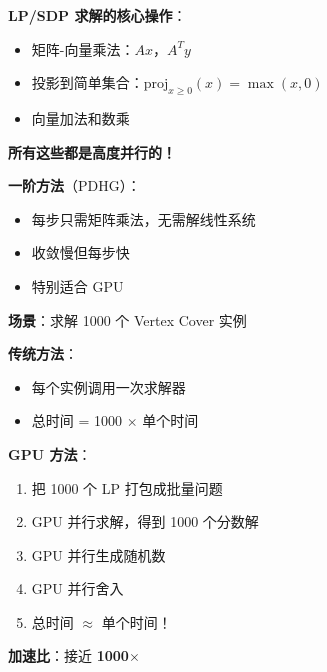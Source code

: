 \documentclass[12pt, a4paper]{ctexart}
\begin{document}
\begin{gpubox}

\textbf{LP/SDP 求解的核心操作}：

\begin{itemize}
    \item 矩阵-向量乘法：$Ax$，$A^T y$
    \item 投影到简单集合：$\text{proj}_{x \geq 0}(x) = \max(x, 0)$
    \item 向量加法和数乘
\end{itemize}

\textbf{所有这些都是高度并行的！}

\textbf{一阶方法}（PDHG）：
\begin{itemize}
    \item 每步只需矩阵乘法，无需解线性系统
    \item 收敛慢但每步快
    \item 特别适合 GPU
\end{itemize}

\end{gpubox}

\begin{gpubox}[随机舍入的批量并行]

\textbf{场景}：求解 1000 个 Vertex Cover 实例

\textbf{传统方法}：
\begin{itemize}
    \item 每个实例调用一次求解器
    \item 总时间 = 1000 $\times$ 单个时间
\end{itemize}

\textbf{GPU 方法}：
\begin{enumerate}
    \item 把 1000 个 LP 打包成批量问题
    \item GPU 并行求解，得到 1000 个分数解
    \item GPU 并行生成随机数
    \item GPU 并行舍入
    \item 总时间 $\approx$ 单个时间！
\end{enumerate}

\textbf{加速比}：接近 \textbf{1000$\times$}

\end{gpubox}
\end{document}
